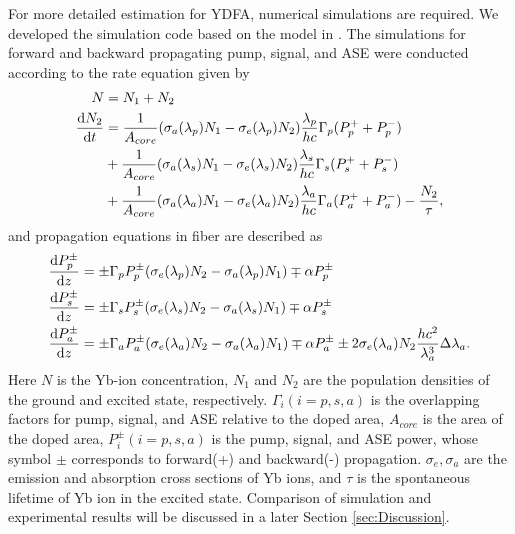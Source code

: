 \documentclass{osa-article}
\begin{document}
For more detailed estimation for YDFA, numerical simulations are required.
We developed the simulation code based on the model in \cite{roeser200894}.
The simulations for forward and backward propagating pump, signal, and ASE were conducted according to the rate equation given by
\begin{equation}
  \begin{split}
    N &= N_{1} + N_{2}\\
    \dv{N_{2}}{t} &= \frac{1}{A_{core}} (\sigma_{a}(\lambda_{p})N_{1} - \sigma_{e}(\lambda_{p})N_{2}) \frac{\lambda_{p}}{hc}\Gamma_{p} (P^{+}_{p} + P^{-}_{p})\\
    &+ \frac{1}{A_{core}} (\sigma_{a}(\lambda_{s})N_{1} - \sigma_{e}(\lambda_{s})N_{2}) \frac{\lambda_{s}}{hc}\Gamma_{s} (P^{+}_{s} + P^{-}_{s})\\
    &+ \frac{1}{A_{core}} (\sigma_{a}(\lambda_{a})N_{1} - \sigma_{e}(\lambda_{a})N_{2}) \frac{\lambda_{a}}{hc}\Gamma_{a} (P^{+}_{a} + P^{-}_{a}) - \frac{N_{2}}{\tau},
  \end{split}
  \label{eq:RateEquation}
\end{equation} 
and propagation equations in fiber are described as
\begin{align}
  \dv{P^{\pm}_{p}}{z} &= \pm\Gamma_{p}P^{\pm}_{p}(\sigma_{e}(\lambda_{p})N_{2} - \sigma_{a}(\lambda_{p})N_{1}) \mp \alpha P^{\pm}_{p} \label{eq:PumpPropagationEquation}\\
  \dv{P^{\pm}_{s}}{z} &= \pm\Gamma_{s}P^{\pm}_{s}(\sigma_{e}(\lambda_{s})N_{2} - \sigma_{a}(\lambda_{s})N_{1}) \mp \alpha P^{\pm}_{s} \label{eq:SignalPropagationEquation}\\
  \dv{P^{\pm}_{a}}{z} &= \pm\Gamma_{a}P^{\pm}_{a}(\sigma_{e}(\lambda_{a})N_{2} - \sigma_{a}(\lambda_{a})N_{1}) \mp \alpha P^{\pm}_{a} \pm 2\sigma_{e}(\lambda_{a})N_{2}\frac{hc^{2}}{\lambda_{a}^{3}}\Delta\lambda_{a}. \label{eq:ASEPropagationEquation}
\end{align}
Here $N$ is the Yb-ion concentration, $N_{1}$ and $N_{2}$ are the population densities of the ground and excited state, respectively.
$\Gamma_{i} (i = p, s, a)$ is the overlapping factors for pump, signal, and ASE relative to the doped area, $A_{core}$ is the area of the doped area, $P^{\pm}_{i} (i = p, s, a)$ is the pump, signal, and ASE power, whose symbol $\pm$ corresponds to forward(+) and backward(-) propagation.
$\sigma_{e}, \sigma_{a}$ are the emission and absorption cross sections of Yb ions, and $\tau$ is the spontaneous lifetime of Yb ion in the excited state.
Comparison of simulation and experimental results will be discussed in a later Section \ref{sec:Discussion}.
\end{document}
